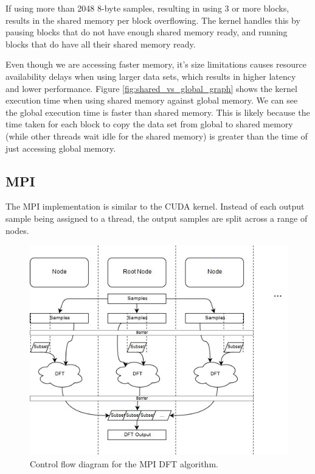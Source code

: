 \documentclass[11pt,a4paper]{article}
\begin{document}
If using more than 2048 8-byte samples, resulting in using 3 or more blocks, results in the shared memory per block overflowing. The kernel handles this by pausing blocks that do not have enough shared memory ready, and running blocks that do have all their shared memory ready.
 
Even though we are accessing faster memory, it's size limitations causes resource availability delays when using larger data sets, which results in higher latency and lower performance. Figure \ref{fig:shared_vs_global_graph} shows the kernel execution time when using shared memory against global memory. We can see the global execution time is faster than shared memory. This is likely because the time taken for each block to copy the data set from global to shared memory (while other threads wait idle for the shared memory) is greater than the time of just accessing global memory.


\subsection{MPI}
The MPI implementation is similar to the CUDA kernel. Instead of each output sample being assigned to a thread, the output samples are split across a range of nodes. 

\begin{figure}[H]
\begin{center}
\includegraphics[scale=0.7]{mpi_impl1}
\end{center}
\caption{Control flow diagram for the MPI DFT algorithm.}
\label{fig:train10x}
\end{figure}
\end{document}
